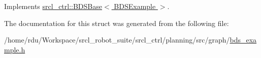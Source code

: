 Implements \hyperlink{classsrcl__ctrl_1_1BDSBase_af4b9b160e24ac0b22c365243cb673c8b}{srcl\-\_\-ctrl\-::\-B\-D\-S\-Base$<$ B\-D\-S\-Example $>$}.



The documentation for this struct was generated from the following file\-:\begin{DoxyCompactItemize}
\item 
/home/rdu/\-Workspace/srcl\-\_\-robot\-\_\-suite/srcl\-\_\-ctrl/planning/src/graph/\hyperlink{bds__example_8h}{bds\-\_\-example.\-h}\end{DoxyCompactItemize}
